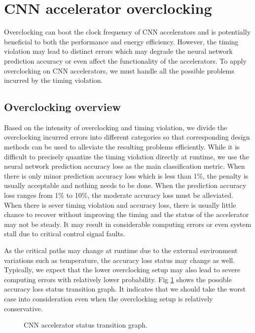 \section{CNN accelerator overclocking} \label{sec:framework}
Overclocking can boot the clock frequency of CNN accelerators and is potentially beneficial to both 
the performance and energy efficiency. However, the timing violation may lead to distinct errors which 
may degrade the neural network prediction accuracy or even affect the functionality of the accelerators. 
To apply overclocking on CNN accelerators, we must handle all the possible 
problems incurred by the timing violation. 

\subsection{Overclocking overview}
Based on the intensity of overclocking and timing 
violation, we divide the overclocking incurred errors into different 
categories so that corresponding design methods can be used to 
alleviate the resulting problems efficiently. While it is difficult 
to precisely quantize the timing violation directly at runtime, we use 
the neural network prediction accuracy loss as the main 
classification metric. When there is only minor prediction accuracy 
loss which is less than 1\%, the penalty is usually acceptable 
and nothing needs to be done. When the prediction accuracy loss 
ranges from 1\% to 10\%, the moderate accuracy loss must be 
alleviated. When there is sever timing violation and 
accuracy loss, there is usually little chance to recover 
without improving the timing and the status of the accelerator 
may not be steady. It may result in considerable computing errors 
or even system stall due to critical control signal faults.  

As the critical paths may change at runtime due to the external 
environment variations such as temperature, the accuracy loss status may 
change as well. Typically, we expect that the lower overclocking setup 
may also lead to severe computing errors with relatively lower probability.
Fig \ref{fig:loss-estimation} shows the possible accuracy loss status 
transition graph. It indicates that we should take the worst case 
into consideration even when the overclocking setup is relatively conservative.
\begin{figure}
    \caption{CNN accelerator status transition graph.}
\label{fig:loss-estimation}
\vspace{-1em}
\end{figure}

